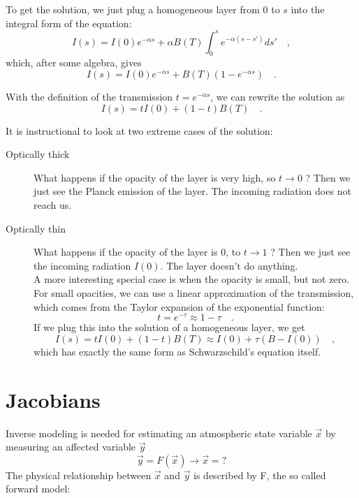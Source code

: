 To get the solution, we just plug a homogeneous layer from 0 to $s$ into the integral 
form of the equation:
\begin{equation}
	I(s) = I(0) e^{-\alpha s} + \alpha B(T)\int_{0}^{s} e^{-\alpha (s-s')} ds'  \quad ,
\end{equation}
which, after some algebra, gives
\begin{equation}
	I(s) = I(0) e^{-\alpha s} + B(T) \left( 1-e^{-\alpha s}
        \right) \quad .
\end{equation}

With the definition of the transmission $t = e^{-\alpha s}$, we can rewrite the solution as
\begin{equation}
	I(s) = t I(0)  + \left( 1-t \right) B(T) \quad .
\end{equation}

It is instructional to look at two extreme cases of the solution:

\begin{description}
\item[Optically thick]
What happens if the opacity of the layer is very high, so $ t\rightarrow0$ ? 
Then we just see the Planck emission of the layer. The incoming radiation does not reach us.
\item[Optically thin]
What happens if the opacity of the layer is 0, to $ t \rightarrow 1$ ? Then we just see
the incoming radiation $I(0)$. The layer doesn't do anything.\\

A more interesting special case is when the opacity is small, but not zero. For small opacities, 
we can use a linear approximation of the transmission, which comes from the Taylor expansion
of the exponential function:
\begin{equation}
	t = e^{-\tau} \approx 1 - \tau \quad .
\end{equation}
If we plug this into the solution of a homogeneous layer, we get
\begin{equation}
	I(s) = t I(0)  + \left( 1-t \right) B(T) \approx I(0) + \tau \left( B - I(0)\right) \quad ,
\end{equation}
which has exactly the same form as Schwarzschild's equation itself.
\end{description}


\section{Jacobians}
Inverse modeling is needed for estimating an atmospheric state variable
$\vec{x}$ by measuring an affected variable $\vec{y}$
\begin{equation*}
\vec{y}=F(\vec{x}) \rightarrow \vec{x}=?
\end{equation*}
The physical relationship between $\vec{x}$ and $\vec{y}$ is described by F, the
so called forward model:

